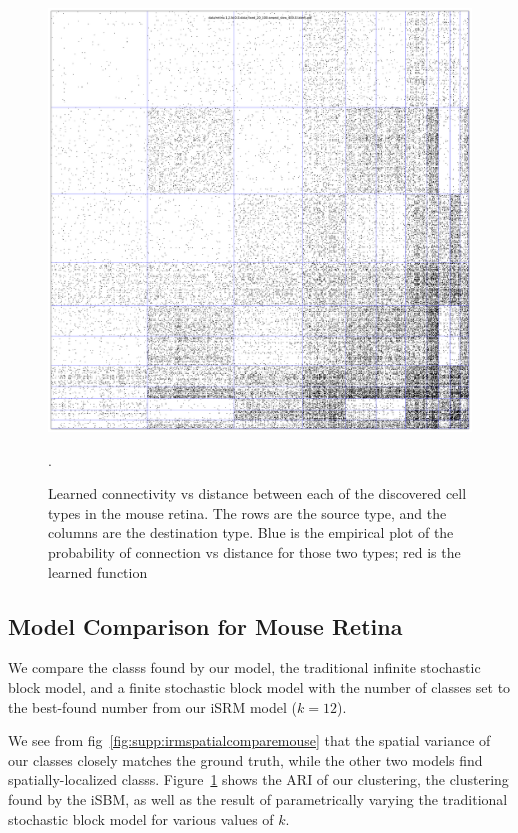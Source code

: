 \documentclass{nature}
\begin{document}
\begin{figure}[h!]
  \centering 
    \centerline{\includegraphics[width=7in,page=2]{mouseretina/retina.1.2.ld.0.0.data-fixed_20_100-anneal_slow_400.0.latent.pdf}}
  \caption{Learned connectivity vs distance between each of the discovered cell types in the mouse retina. The rows are the source type, and the columns are the destination type. Blue is the empirical plot of the probability of connection vs distance for those two types; red is the learned function}. 

\label{fig:supp:mousecompareari}
\end{figure}

\FloatBarrier
\subsection{Model Comparison for Mouse Retina}

We compare the classs found by our model, the traditional infinite
stochastic block model, and a finite stochastic block model with the number
of classes set to the best-found number from our iSRM model ($k=12$).

We see from fig~\ref{fig:supp:irmspatialcomparemouse} that the spatial
variance of our classes closely matches the ground truth, while the
other two models find spatially-localized
classs. Figure~\ref{fig:supp:mousecompareari} shows the ARI of our
clustering, the clustering found by the iSBM,
as well as the result of parametrically varying the traditional stochastic
block model for various values of $k$. 
\end{document}
